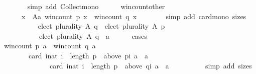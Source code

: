 \begin{isabellebody}
\ \ \ \ \ \ \isamarkupfalse%
\ {\isacharparenleft}{\kern0pt}simp\ add{\isacharcolon}{\kern0pt}\ Collect{\isacharunderscore}{\kern0pt}mono{\isacharparenright}{\kern0pt}\isanewline
\ \ \ \ \isamarkupfalse%
\ win{\isacharunderscore}{\kern0pt}count{\isacharunderscore}{\kern0pt}other{\isacharcolon}{\kern0pt}\isanewline
\ \ \ \ \ \ {\isachardoublequoteopen}{\isasymforall}x\ {\isasymin}\ A{\isacharminus}{\kern0pt}{\isacharbraceleft}{\kern0pt}a{\isacharbraceright}{\kern0pt}{\isachardot}{\kern0pt}\ win{\isacharunderscore}{\kern0pt}count\ p\ x\ {\isasymge}\ win{\isacharunderscore}{\kern0pt}count\ q\ x{\isachardoublequoteclose}\isanewline
\ \ \ \ \ \ \isamarkupfalse%
\ {\isacharparenleft}{\kern0pt}simp\ add{\isacharcolon}{\kern0pt}\ card{\isacharunderscore}{\kern0pt}mono\ sizes{\isacharparenright}{\kern0pt}\isanewline
\ \ \ \ \isamarkupfalse%
\isanewline
\ \ \ \ \ \ {\isachardoublequoteopen}elect\ plurality\ A\ q\ {\isacharequal}{\kern0pt}\ elect\ plurality\ A\ p\ {\isasymor}\isanewline
\ \ \ \ \ \ \ \ \ \ \ elect\ plurality\ A\ q\ {\isacharequal}{\kern0pt}\ {\isacharbraceleft}{\kern0pt}a{\isacharbraceright}{\kern0pt}{\isachardoublequoteclose}\isanewline
\ \ \ \ \isamarkupfalse%
\ cases\isanewline
\ \ \ \ \ \ \isamarkupfalse%
\ {\isachardoublequoteopen}win{\isacharunderscore}{\kern0pt}count\ p\ a\ {\isacharequal}{\kern0pt}\ win{\isacharunderscore}{\kern0pt}count\ q\ a{\isachardoublequoteclose}\isanewline
\ \ \ \ \ \ \isamarkupfalse%
\isanewline
\ \ \ \ \ \ \ \ {\isachardoublequoteopen}card\ {\isacharbraceleft}{\kern0pt}i{\isacharcolon}{\kern0pt}{\isacharcolon}{\kern0pt}nat{\isachardot}{\kern0pt}\ i\ {\isacharless}{\kern0pt}\ length\ p\ {\isasymand}\ above\ {\isacharparenleft}{\kern0pt}p{\isacharbang}{\kern0pt}i{\isacharparenright}{\kern0pt}\ a\ {\isacharequal}{\kern0pt}\ {\isacharbraceleft}{\kern0pt}a{\isacharbraceright}{\kern0pt}{\isacharbraceright}{\kern0pt}\ {\isacharequal}{\kern0pt}\isanewline
\ \ \ \ \ \ \ \ \ \ \ \ \ \ card\ {\isacharbraceleft}{\kern0pt}i{\isacharcolon}{\kern0pt}{\isacharcolon}{\kern0pt}nat{\isachardot}{\kern0pt}\ i\ {\isacharless}{\kern0pt}\ length\ p\ {\isasymand}\ above\ {\isacharparenleft}{\kern0pt}q{\isacharbang}{\kern0pt}i{\isacharparenright}{\kern0pt}\ a\ {\isacharequal}{\kern0pt}\ {\isacharbraceleft}{\kern0pt}a{\isacharbraceright}{\kern0pt}{\isacharbraceright}{\kern0pt}{\isachardoublequoteclose}\isanewline
\ \ \ \ \ \ \ \ \isamarkupfalse%
\ {\isacharparenleft}{\kern0pt}simp\ add{\isacharcolon}{\kern0pt}\ sizes{\isacharparenright}{\kern0pt}\isanewline

\end{isabellebody}

